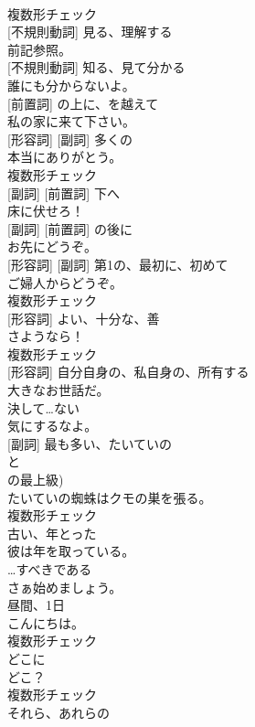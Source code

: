 \documentclass[8pt]{extreport}
\begin{document}
\begin{CJK}{UTF8}{min}
\\	複数形チェック
\\	[動詞] [不規則動詞]	見る、理解する	
\\	前記参照。	
\\	[動詞] [不規則動詞]	知る、見て分かる	
\\	誰にも分からないよ。	
\\	[副詞] [前置詞]	の上に、を越えて	
\\	私の家に来て下さい。	
\\	[名詞] [形容詞] [副詞]	多くの	
\\	本当にありがとう。	
\\	複数形チェック
\\	[形容詞] [副詞] [前置詞]	下へ	
\\	床に伏せろ！	
\\	[形容詞] [副詞] [前置詞]	の後に	
\\	お先にどうぞ。	
\\	[名詞] [形容詞] [副詞]	第1の、最初に、初めて	
\\	ご婦人からどうぞ。	
\\	複数形チェック
\\	[名詞] [形容詞]	よい、十分な、善	
\\	さようなら！	
\\	複数形チェック
\\	[動詞] [形容詞]	自分自身の、私自身の、所有する	
\\	大きなお世話だ。	
\\	[副詞]	決して…ない	
\\	気にするなよ。	
\\	[名詞] [副詞]	最も多い、たいていの 
\\	と
\\	の最上級)	
\\	たいていの蜘蛛はクモの巣を張る。	
\\	複数形チェック
\\	[形容詞]	古い、年とった	
\\	彼は年を取っている。	
\\	[助動詞]	…すべきである	
\\	さぁ始めましょう。	
\\	[名詞]	昼間、1日	
\\	こんにちは。	
\\	複数形チェック
\\	[代名詞]	どこに	
\\	どこ？	
\\	複数形チェック
\\	[代名詞]	それら、あれらの 

\end{CJK}
\end{document}

